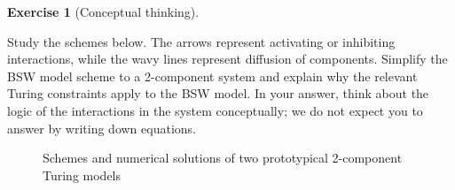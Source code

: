 \documentclass[
  letterpaper,
  DIV=11,
  numbers=noendperiod]{scrreprt}
\theoremstyle{definition}
\newtheorem{exercise}{Exercise}[chapter]
\theoremstyle{remark}
\begin{document}
\begin{exercise}[Conceptual
thinking]\protect\hypertarget{exr-tur}{}\label{exr-tur}

Study the schemes below. The arrows represent activating or inhibiting
interactions, while the wavy lines represent diffusion of components.
Simplify the BSW model scheme to a 2-component system and explain why
the relevant Turing constraints apply to the BSW model. In your answer,
think about the logic of the interactions in the system conceptually; we
do not expect you to answer by writing down equations.

\begin{figure}


\caption{\label{fig-turing}Schemes and numerical solutions of two
prototypical 2-component Turing models}

\end{figure}%

\begin{figure}

\end{figure}
\end{exercise}
\end{document}
